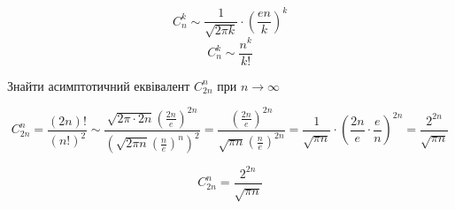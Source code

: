 \documentclass[11pt, a4paper]{article} %
\begin{document}
\begin{mdframed}[style=ans]
    $$C_n^k \sim \frac{1}{\sqrt{2\pi k}} \cdot \left(\frac{en}{k}\right)^k$$
    $$C_n^k \sim \frac{n^k}{k!}$$
\end{mdframed}

\begin{mdframed}
    Знайти асимптотичний еквівалент $C_{2n}^n$ при $n\to\infty$
\end{mdframed}

$$C_{2n}^n = \frac{(2n)!}{(n!)^2} 
\sim \frac{\sqrt{2\pi \cdot 2n}\left(\frac{2n}{e}\right)^{2n}}{(\sqrt{2\pi n}\left(\frac{n}{e}\right)^n)^2}
= \frac{\left(\frac{2n}{e}\right)^{2n}}{\sqrt{\pi n}\left(\frac{n}{e}\right)^{2n}}
= \frac{1}{\sqrt{\pi n}}\cdot \left(\frac{2n}{e}\cdot \frac{e}{n}\right)^{2n} = \frac{2^{2n}}{\sqrt{\pi n}}$$

\begin{mdframed}[style=ans]
    $$C_{2n}^n = \frac{2^{2n}}{\sqrt{\pi n}}$$
\end{mdframed}
\end{document}
